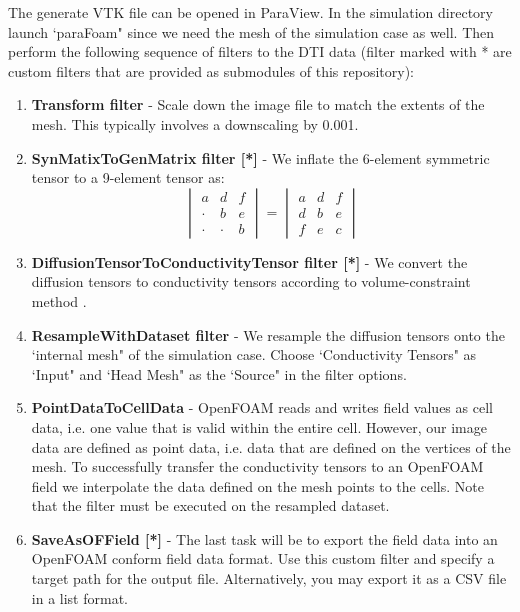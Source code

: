 The generate VTK file can be opened in ParaView. In the simulation directory launch `paraFoam" since we need the mesh of the
simulation case as well. Then perform the following sequence of filters to the DTI data (filter marked with * are custom
filters that are provided as submodules of this repository):
\begin{enumerate}
    \item \textbf{Transform filter} - Scale down the image file to match the extents of the mesh. This typically involves
                                      a downscaling by 0.001.
    \item \textbf{SynMatixToGenMatrix filter [*]} - We inflate the 6-element symmetric tensor to a 9-element tensor as:
            \begin{equation}
                \begin{vmatrix}
                    a & d & f \\
                    \cdot & b & e \\
                    \cdot & \cdot & b
                \end{vmatrix}
                =
                \begin{vmatrix}
                    a & d & f \\
                    d & b & e \\
                    f & e & c
                \end{vmatrix}
            \end{equation}
    \item \textbf{DiffusionTensorToConductivityTensor filter [*]} - We convert the diffusion tensors to conductivity tensors
                                                                    according to volume-constraint method \cite{wolters2006influence}.
    \item \textbf{ResampleWithDataset filter} - We resample the diffusion tensors onto the `internal mesh" of the simulation
                                                case. Choose `Conductivity Tensors" as `Input" and `Head Mesh" as
                                                the `Source" in the filter options.
    \item \textbf{PointDataToCellData} - OpenFOAM reads and writes field values as cell data, i.e. one value that is valid
                                         within the entire cell. However, our image data are defined as point data, i.e. data
                                         that are defined on the vertices of the mesh. To successfully transfer the conductivity
                                         tensors to an OpenFOAM field we interpolate the data defined on the mesh points to
                                         the cells. Note that the filter must be executed on the resampled dataset.
    \item \textbf{SaveAsOFField [*]} - The last task will be to export the field data into an OpenFOAM conform field data format.
                                       Use this custom filter and specify a target path for the output file. Alternatively,
                                       you may export it as a CSV file in a list format.
\end{enumerate}
